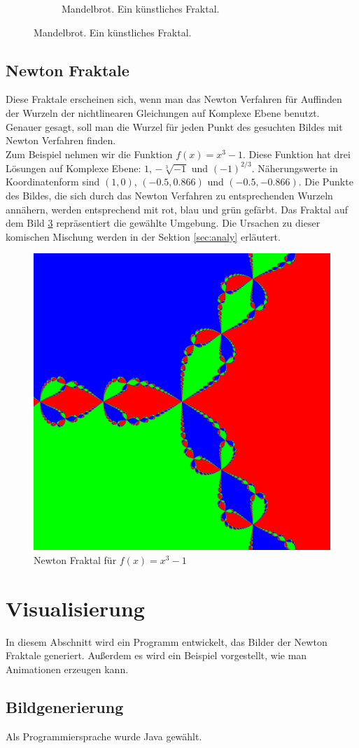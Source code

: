 \documentclass[a4paper,12pt]{llncs}
\numberwithin{equation}{section}
\begin{document}
\begin{figure}[ht]
\begin{subfigure}{.5\textwidth}
	\caption{Mandelbrot. Ein künstliches Fraktal. \cite{fractal_mandelbrot}}
	\label{fig:frac_math}
\end{subfigure}%
\end{figure}
\subsection{Newton Fraktale}
Diese Fraktale erscheinen sich, wenn man das Newton Verfahren für Auffinden der Wurzeln der nichtlinearen Gleichungen auf Komplexe Ebene benutzt.
Genauer gesagt, soll man die Wurzel für jeden Punkt des gesuchten Bildes mit Newton Verfahren finden.\\
Zum Beispiel nehmen wir die Funktion $f(x) = x^3 -1$. Diese Funktion hat drei Lösungen auf Komplexe Ebene: $1$, $-\sqrt[3]{-1}$ und $(-1)^{2/3}$. Näherungswerte in Koordinatenform sind $(1, 0)$, $(-0.5, 0.866)$ und $(-0.5, -0.866)$. Die Punkte des Bildes, die sich durch das Newton Verfahren zu entsprechenden Wurzeln annähern, werden entsprechend mit rot, blau und grün gefärbt.
Das Fraktal auf dem Bild \ref{fig:output3_0} repräsentiert die gewählte Umgebung.
Die Ursachen zu dieser komischen Mischung werden in der Sektion \ref{sec:analy} erläutert.
\begin{figure}[ht]   
	\centering
	\includegraphics[width=.5\linewidth]{figures/output3_0}
	\caption{Newton Fraktal für $f(x)=x^3-1$ }
	\label{fig:output3_0}
\end{figure}
\section{Visualisierung}\label{sec:vis}
In diesem Abschnitt wird ein Programm entwickelt, das Bilder der Newton Fraktale generiert.
Außerdem es wird ein Beispiel vorgestellt, wie man Animationen erzeugen kann.
\subsection{Bildgenerierung}\label{subs:vis:bild}
Als Programmiersprache wurde Java gewählt.
\end{document}
